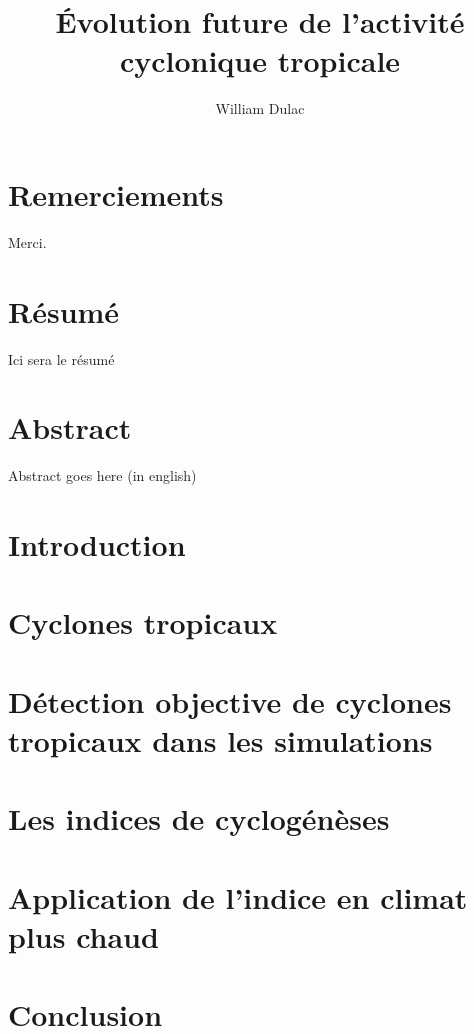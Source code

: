 \documentclass[12pt,twoside,openright]{book}
\title{Évolution future de l'activité cyclonique tropicale}
\author{William Dulac}
\begin{document}
\frontmatter

\makeflyleaf
\pagestyle{fancy}
\renewcommand{\sectionmark}[1]{%
\markboth{\thesection.\ \MakeUppercase{#1}}{}}

\dominitoc

\chapter*{Remerciements}

Merci.

\chapter*{Résumé}

Ici sera le résumé

\chapter*{Abstract}

Abstract goes here (in english)

\tableofcontents
\mainmatter

\chapter*{Introduction}

\mtcaddchapter



\chapter{Cyclones tropicaux}\label{chap:chapitre_1}


\chapter{Détection objective de cyclones tropicaux dans les simulations}\label{chap:chapitre_2}


\chapter{Les indices de cyclogénèses}\label{chap:chapitre_3}


\chapter{Application de l'indice en climat plus chaud}\label{chap:chapitre_4}


\chapter*{Conclusion}


% 

\printbibliography
%
\end{document}
